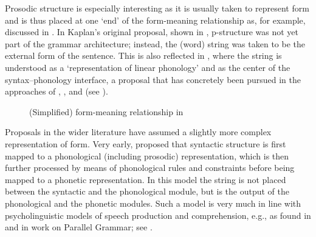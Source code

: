 \documentclass[output=paper,hidelinks]{langscibook}
\begin{document}
Prosodic structure is especially interesting as it is usually taken to represent {\sc form} and is thus  placed at one `end' of the {\sc form-meaning} relationship as, for example, discussed in \citet[362]{kaplan1987three}. In Kaplan's original proposal, shown in , p-structure was not yet part of the grammar architecture; instead, the (word) string was taken to be the external form of the sentence. This is also reflected in \citet[110]{Asudeh2009}, where the string is understood as a `representation of linear phonology' and as the center of the syntax--phonology interface, a proposal that has concretely been pursued in the approaches of  \citet{boegeletal09, boegel-etal2010}, \citet{DM11}, and \citet{MycockLowe2013} (see ).

\begin{figure}
\centering
{}
\caption{(Simplified) {\sc form-meaning} relationship in \citet[362]{kaplan1987three}}
\label{fig:ron_architecture}
\end{figure}

Proposals in the wider literature have assumed a slightly more complex representation of {\sc form}. Very early, \citet{Selkirk1984} proposed that syntactic structure is first mapped to a phonological (including prosodic) representation, which is then further processed by means of phonological rules and constraints before being mapped to a phonetic representation. In this model the string is not placed between the syntactic and the phonological module, but is the output of the phonological and the phonetic modules. Such a model is very much in line with psycholinguistic models of speech production and comprehension, e.g., as found in \citet{Levelt1999} and in  work on Parallel Grammar; see . 
\end{document}
